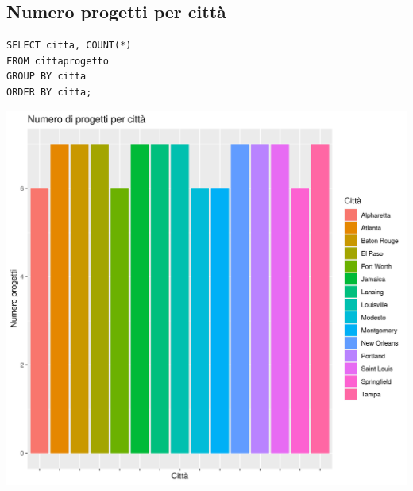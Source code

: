 \documentclass{article}
\begin{document}
\subsection{Numero progetti per città}
\begin{verbatim}
SELECT citta, COUNT(*) 
FROM cittaprogetto 
GROUP BY citta 
ORDER BY citta;
\end{verbatim}
\begin{center}
\includegraphics[width=\textwidth]{plot_numero_progetti_citta.png}
\end{center}

\newpage
\end{document}
